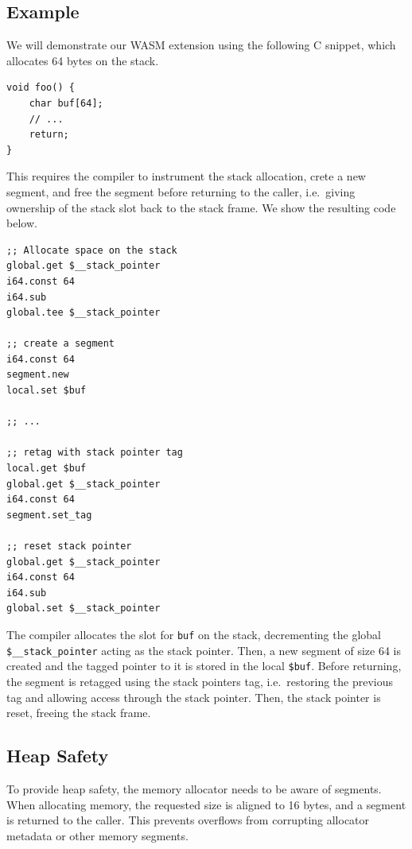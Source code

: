 \subsection{Example}
\label{subsec:example}

We will demonstrate our \ac{WASM} extension using the following C snippet, which allocates 64 bytes on the stack.
\begin{lstlisting}[frame=h,style=customc,
    label={lst:wasm-example-c}]
void foo() {
    char buf[64];
    // ...
    return;
}
\end{lstlisting}

This requires the compiler to instrument the stack allocation, crete a new segment, and free the segment before returning to the caller, i.e.\ giving ownership of the stack slot back to the stack frame.
We show the resulting code below.

\begin{lstlisting}[frame=h,style=customwasm,
    label={lst:wasm-example}]
;; Allocate space on the stack
global.get $__stack_pointer
i64.const 64
i64.sub
global.tee $__stack_pointer

;; create a segment
i64.const 64
segment.new
local.set $buf

;; ...

;; retag with stack pointer tag
local.get $buf
global.get $__stack_pointer
i64.const 64
segment.set_tag

;; reset stack pointer
global.get $__stack_pointer
i64.const 64
i64.sub
global.set $__stack_pointer
\end{lstlisting}

The compiler allocates the slot for \lstinline[style=customc]{buf} on the stack, decrementing the global \lstinline[style=customwasm]{$__stack_pointer} acting as the stack pointer.
Then, a new segment of size 64 is created and the tagged pointer to it is stored in the local \lstinline[style=customwasm]{$buf}.
Before returning, the segment is retagged using the stack pointers tag, i.e.\ restoring the previous tag and allowing access through the stack pointer.
Then, the stack pointer is reset, freeing the stack frame.

\subsection{Heap Safety}
\label{subsec:heap-safety}

To provide heap safety, the memory allocator needs to be aware of segments.
When allocating memory, the requested size is aligned to 16 bytes, and a segment is returned to the caller.
This prevents overflows from corrupting allocator metadata or other memory segments.

